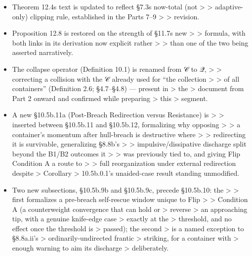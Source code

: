 \documentclass[
]{article}
\begin{document}
\begin{itemize}
  \textgreater{} \textgreater{} coherence N, completing the derivation
  Proposition 12.8 needs.
\item
  Theorem 12.4s text is updated to reflect §7.3s now-total (not
  \textgreater{} \textgreater{} adaptive-only) clipping rule,
  established in the Parts 7--9 \textgreater{} \textgreater{} revision.
\item
  Proposition 12.8 is restored on the strength of §11.7s new
  \textgreater{} \textgreater{} formula, with both links in its
  derivation now explicit rather \textgreater{} \textgreater{} than one
  of the two being asserted narratively.
\item
  The collapse operator (Definition 10.1) is renamed from 𝒞 to 𝒬,
  \textgreater{} \textgreater{} correcting a collision with the 𝒞
  already used for ``the collection \textgreater{} \textgreater{} of all
  containers'' (Definition 2.6; §4.7--§4.8) --- present in
  \textgreater{} the \textgreater{} document from Part 2 onward and
  confirmed while preparing \textgreater{} this \textgreater{} segment.
\item
  A new §10.5b.11a (Post-Breach Redirection versus Resistance) is
  \textgreater{} \textgreater{} inserted between §10.5b.11 and
  §10.5b.12, formalizing why opposing \textgreater{} \textgreater{} a
  container's momentum after hull-breach is destructive where
  \textgreater{} \textgreater{} redirecting it is survivable,
  generalizing §8.8b's \textgreater{} \textgreater{}
  impulsive/dissipative discharge split beyond the B1/B2 outcomes it
  \textgreater{} \textgreater{} was previously tied to, and giving Flip
  Condition A a route to \textgreater{} \textgreater{} full
  reorganization under external redirection despite \textgreater{}
  Corollary \textgreater{} 10.5b.0.1's unaided-case result standing
  unmodified.
\item
  Two new subsections, §10.5b.9b and §10.5b.9c, precede §10.5b.10: the
  \textgreater{} \textgreater{} first formalizes a pre-breach
  self-rescue window unique to Flip \textgreater{} \textgreater{}
  Condition A (a counterweight convergence that can hold or
  \textgreater{} reverse \textgreater{} an approaching tip, with a
  genuine knife-edge case \textgreater{} exactly at the \textgreater{}
  threshold, and no effect once the threshold is \textgreater{} passed);
  the second \textgreater{} is a named exception to §8.8a.ii's
  \textgreater{} ordinarily-undirected frantic \textgreater{} striking,
  for a container with \textgreater{} enough warning to aim its
  discharge \textgreater{} deliberately.

\end{itemize}
\end{document}
